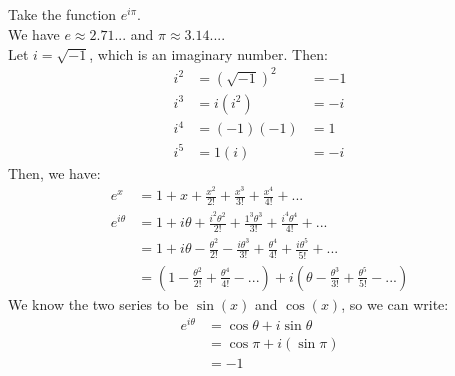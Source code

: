 \documentclass{article}
\begin{document}
\subsection{}
Take the function $e^{i\pi}$.\\
We have $e \approx 2.71...$ and $\pi \approx 3.14...$.\\
Let $i = \sqrt{-1}$, which is an imaginary number. Then:
\begin{align*}
    i^2 & = (\sqrt{-1})^2 & = -1\\
    i^3 & = i(i^2) & = -i\\
    i^4 & = (-1)(-1) & = 1\\
    i^5 & = 1(i) & = -i
\end{align*}
Then, we have:
\begin{align*}
    e^x & = 1 + x + \frac{x^2}{2!} + \frac{x^3}{3!} + \frac{x^4}{4!} +...\\
    e^{i\theta} & = 1 + i\theta + \frac{i^2\theta^2}{2!} + \frac{1^3\theta^3}{3!} + \frac{i^4\theta^4}{4!} + ...\\
    & = 1 + i\theta - \frac{\theta^2}{2!} - \frac{i\theta^3}{3!} + \frac{\theta^4}{4!} + \frac{i\theta^5}{5!} + ...\\
    & = (1 -\frac{\theta^2}{2!} + \frac{\theta^4}{4!} - ...) + i(\theta - \frac{\theta^3}{3!} + \frac{\theta^5}{5!} - ...)
\end{align*}
We know the two series to be $\sin(x)$ and $\cos(x)$,  so we can write:
\begin{align*}
    e^{i\theta} & = \cos \theta + i \sin \theta\\
    & = \cos \pi + i (\sin \pi)\\
    & = -1 
\end{align*}
\end{document}
